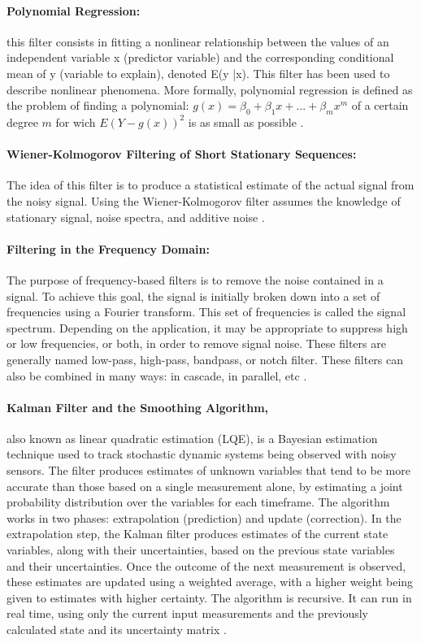 \paragraph{Polynomial Regression:} this filter consists in fitting a nonlinear relationship between the values of an independent variable x (predictor variable)  and the corresponding conditional mean of y (variable to explain), denoted E(y |x). This filter has been used to describe nonlinear phenomena. More formally, polynomial regression is defined as the problem of finding a polynomial:  $g(x)=\beta_{0}+\beta_{1}x+...+\beta_{m}x^{m}$ of a certain degree $m$ for wich $E(Y-g(x))^{2}$ is as small as possible \cite{kendall1961advanced}.

\paragraph{Wiener-Kolmogorov Filtering of Short Stationary Sequences:}  
The idea of this filter is to produce a statistical estimate of the actual signal from the noisy signal. Using the Wiener-Kolmogorov filter assumes the knowledge of stationary signal, noise spectra, and additive noise \cite{pollock2007wiener}.

\paragraph{Filtering in the Frequency Domain:}   The purpose of frequency-based filters is to remove the noise contained in a signal. To achieve this goal, the signal is initially broken down into a set of frequencies using a Fourier transform. This set of frequencies is called the signal spectrum. Depending on the application, it may be appropriate to suppress high or low frequencies, or both, in order to remove signal noise. These filters are generally named low-pass, high-pass, bandpass, or notch filter. These filters can also be combined in many ways: in cascade, in parallel, etc \cite{buttkus2012spectral}.

\paragraph{Kalman Filter and the Smoothing Algorithm,} also known as linear quadratic estimation (LQE), is a Bayesian estimation technique used to track stochastic dynamic systems being observed with noisy sensors. The filter produces estimates of unknown variables that tend to be more accurate than those based on a single measurement alone, by estimating a joint probability distribution over the variables for each timeframe. The algorithm works in two phases: extrapolation (prediction) and update (correction). In the extrapolation step, the Kalman filter produces estimates of the current state variables, along with their uncertainties, based on the previous state variables and their uncertainties. Once the outcome of the next measurement is observed, these estimates are updated using a weighted average, with a higher weight being given to estimates with higher certainty. The algorithm is recursive. It can run in real time, using only the current input measurements and the previously calculated state and its uncertainty matrix \cite{matthies1989kalman}.



